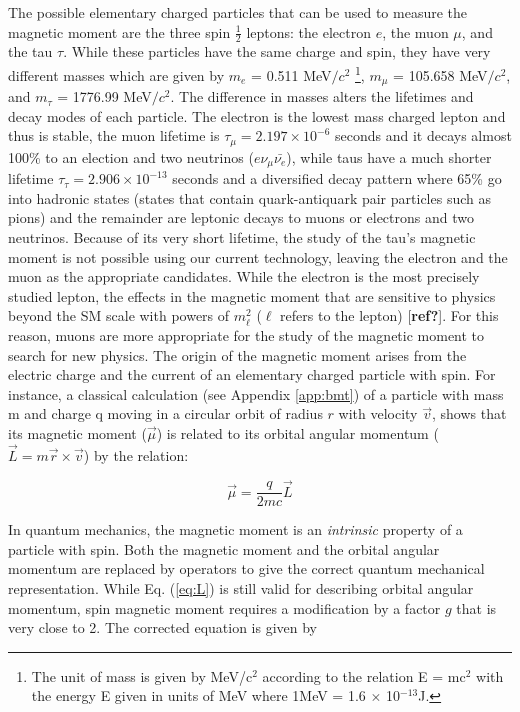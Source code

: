 \documentclass{outhesis}
\begin{document}
The possible elementary charged particles that can be used to measure the magnetic moment are the three spin $\frac{1}{2}$ leptons: the electron $e$, the muon $\mu$, and the tau $\tau$. While these particles have the same charge and spin, they have very different masses which are given by $m_e$ = 0.511 MeV$/c^2$ \footnote{The unit of mass is given by MeV/c$^2$ according to the relation E = mc$^2$ with the energy E given in units of MeV where 1MeV = 1.6 $\times$ 10$^{-13}$J.}, $m_{\mu}$ = 105.658 MeV$/c^2$, and $m_{\tau}$ = 1776.99 MeV$/c^2$. The difference in masses alters the lifetimes and decay modes of each particle. The electron is the lowest mass charged lepton and thus is stable, the muon lifetime is $\tau_{\mu} = 2.197 \times 10^{-6}$ seconds and it decays almost 100\% to an election and two neutrinos ($e\nu_{\mu}\bar{\nu_{e}}$), while taus have a much shorter lifetime $\tau_{\tau} = 2.906 \times 10^{-13}$ seconds and a diversified decay pattern where 65\% go into hadronic states (states that contain quark-antiquark pair particles such as pions) and the remainder are leptonic decays to muons or electrons and two neutrinos. Because of its very short lifetime, the study of the tau's magnetic moment is not possible using our current technology, leaving the electron and the muon as the appropriate candidates. While the electron is the most precisely studied lepton, the effects in the magnetic moment that are sensitive to physics beyond the SM scale with powers of $m_\ell^2$ ($\ell$ refers to the lepton) [\textbf{ref?}]. For this reason, muons are more appropriate for the study of the magnetic moment to search for new physics. 
The origin of the magnetic moment arises from the electric charge and the current of an elementary charged particle with spin. For instance, a classical calculation (see Appendix \ref{app:bmt}) of a particle with mass m and charge q moving in a circular orbit of radius $r$ with velocity $\overrightarrow{v}$, shows that its magnetic moment ($\overrightarrow{\mu}$) is related to its orbital angular momentum ($\overrightarrow{L} =m\overrightarrow{r} \times \overrightarrow{v}$) by the relation:

\begin{equation}
\overrightarrow{\mu} = \frac{q}{2mc} \overrightarrow{L}
  \label{eq:L}
\end{equation}

In quantum mechanics, the magnetic moment is an \emph{intrinsic} property of a particle with spin. Both the magnetic moment and the orbital angular momentum are replaced by operators to give the correct quantum mechanical representation. While Eq. (\ref{eq:L}) is still valid for describing orbital angular momentum, spin magnetic moment requires a modification by a factor $g$ that is very close to 2. The corrected equation is given by
\end{document}
